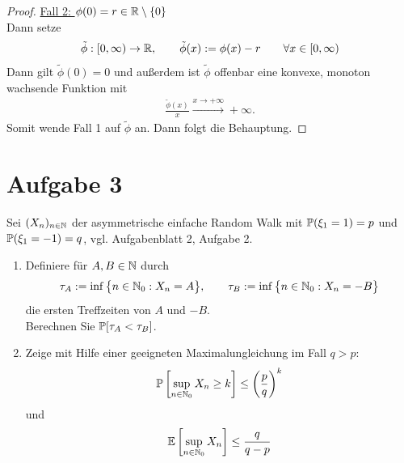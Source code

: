 \documentclass[12pt,a4paper]{article}
\begin{document}
\begin{proof}
\underline{Fall 2: $\phi(0)=r\in\R\setminus\lbrace0\rbrace$}\\
Dann setze
\begin{align*}
\tilde{\phi}:[0,\infty)\to\R,\qquad\tilde{\phi}(x):=\phi(x)-r\qquad\forall x\in[0,\infty)
\end{align*}
Dann gilt $\tilde{\phi}(0)=0$ und außerdem ist $\tilde{\phi}$ offenbar eine konvexe, monoton wachsende Funktion mit
\begin{align*}
\frac{\tilde{\phi}(x)}{x}\stackrel{x\to+\infty}{\longrightarrow}+\infty.
\end{align*}
Somit wende Fall 1 auf $\tilde{\phi}$ an. Dann folgt die Behauptung.
\end{proof}

\section*{Aufgabe 3}
Sei $(X_n)_{n\in\N}$ der asymmetrische einfache Random Walk mit $\P(\xi_1=1)=p$ und $\P(\xi_1=-1)=q$, vgl. Aufgabenblatt 2, Aufgabe 2.
\begin{enumerate}[label=\alph*)]
\item Definiere für $A,B\in\N$ durch
\begin{align*}
\tau_A:=\inf\big\lbrace n\in\N_0:X_n=A\big\rbrace,\qquad \tau_B:=\inf\limits\big\lbrace n\in\N_0:X_n=-B\big\rbrace
\end{align*}
die ersten Treffzeiten von $A$ und $-B$.\\
Berechnen Sie $\P[\tau_A<\tau_B]$.
\item Zeige mit Hilfe einer geeigneten Maximalungleichung im Fall $q>p$:
\begin{align}\label{eqAufgabe3bObere}
\P\left[\sup\limits_{n\in\N_0} X_n\geq k\right]\leq\left(\frac{p}{q}\right)^k
\end{align}
und 
\begin{align}\label{eqAufgabe3bUntere}
\E\left[\sup\limits_{n\in\N_0} X_n\right]\leq\frac{q}{q-p}
\end{align}
\end{enumerate}
\end{document}
